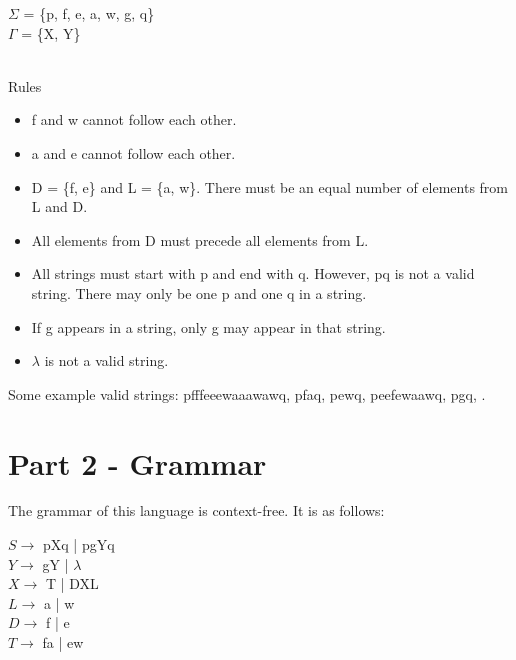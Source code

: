 \documentclass{article}
\begin{document}
\begin{center}
    $\Sigma$ = \{p, f, e, a, w, g, q\}\\
    $\Gamma$ = \{X, Y\} \\
    \hfill \\ 
\end{center}
Rules
\begin{itemize}
    \item f and w cannot follow each other.
    \item a and e cannot follow each other.
    \item D = \{f, e\} and L = \{a, w\}. There must be an equal number of elements from L and D. 
    \item All elements from D must precede all elements from L. 
    \item All strings must start with p and end with q. However, pq is not a valid string. There may only be one p and one q in a string.
    \item If g appears in a string, only g may appear in that string.
    \item $\lambda$ is not a valid string.
    \end{itemize}
Some example valid strings: pfffeeewaaawawq, pfaq, pewq, peefewaawq, pgq, .
\section{Part 2 - Grammar}
The grammar of this language is context-free. It is as follows:
\begin{center}
    $S \rightarrow$ pXq | pgYq \\
    $Y \rightarrow$ gY | $\lambda$ \\
    $X \rightarrow$ T | DXL \\
    $L\rightarrow$ a | w\\
    $D \rightarrow$ f | e \\
    $T \rightarrow$ fa | ew
\end{center}
\newpage
\end{document}
